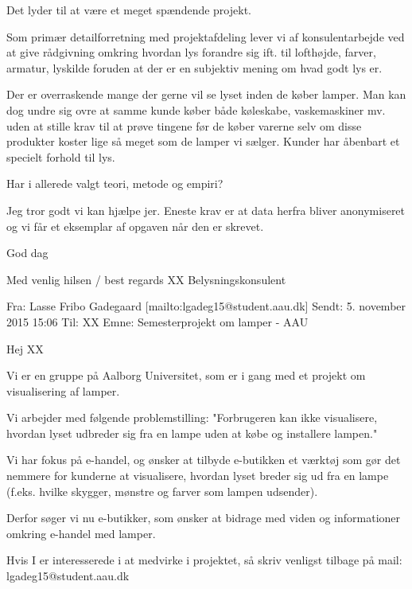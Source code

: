 Det lyder til at være et meget spændende projekt.
 
Som primær detailforretning med projektafdeling lever vi af konsulentarbejde ved at give rådgivning omkring hvordan lys forandre sig ift. til lofthøjde, farver, armatur, lyskilde foruden at der er en subjektiv mening om hvad godt lys er.

Der er overraskende mange der gerne vil se lyset inden de køber lamper. Man kan dog undre sig ovre at samme kunde køber både køleskabe, vaskemaskiner mv. uden at stille krav til at prøve tingene før de køber varerne selv om disse produkter koster lige så meget som de lamper vi sælger. Kunder har åbenbart et specielt forhold til lys. 

Har i allerede valgt teori, metode og empiri? 

Jeg tror godt vi kan hjælpe jer. Eneste krav er at data herfra bliver anonymiseret og vi får et eksemplar af opgaven når den er skrevet.

God dag

Med venlig hilsen / best regards\newline
XX\newline
Belysningskonsulent

\noindent\makebox[\linewidth]{\rule{\paperwidth}{0.4pt}}

Fra: Lasse Fribo Gadegaard [mailto:lgadeg15@student.aau.dk] \newline
Sendt: 5. november 2015 15:06\newline
Til: XX\newline
Emne: Semesterprojekt om lamper - AAU
 
Hej XX
 
Vi er en gruppe på Aalborg Universitet, som er i gang med et projekt om visualisering af lamper.
 
Vi arbejder med følgende problemstilling:
"Forbrugeren kan ikke visualisere, hvordan lyset udbreder sig fra en lampe uden at købe og installere lampen." 

Vi har fokus på e-handel, og ønsker at tilbyde e-butikken et værktøj som gør det nemmere for kunderne at visualisere, hvordan lyset breder sig ud fra en lampe (f.eks. hvilke skygger, mønstre og farver som lampen udsender). 

Derfor søger vi nu e-butikker, som ønsker at bidrage med viden og informationer omkring e-handel med lamper.  

Hvis I er interesserede i at medvirke i projektet, så skriv venligst tilbage på mail: lgadeg15@student.aau.dk 

